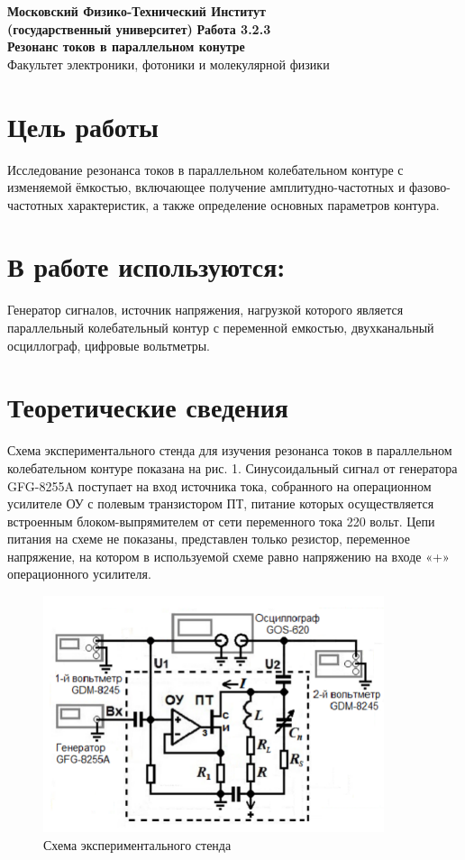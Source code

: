 \documentclass[11pt]{article}
\begin{document}
\begin{titlepage}
\begin{center}
\large\textbf{Московский Физико-Технический Институт}\\
\large\textbf{(государственный университет)}
\vfill
\huge\textbf{ Работа 3.2.3}\\
\huge\textbf{Резонанс токов в параллельном конутре}\\
\vfill
\large Факультет электроники, фотоники и молекулярной физики\\
\end{center}
\end{titlepage}
\tableofcontents
\newpage
\section{Цель работы}
Исследование резонанса токов в параллельном колебательном контуре с изменяемой ёмкостью, включающее получение амплитудно-частотных и фазово-частотных характеристик, а также определение основных параметров контура.
\section{В работе используются:}
Генератор сигналов, источник напряжения, нагрузкой которого является параллельный колебательный контур с переменной емкостью, двухканальный осциллограф, цифровые вольтметры.\\

\section{Теоретические сведения}

Схема экспериментального стенда для изучения резонанса токов в параллельном колебательном контуре показана на рис. 1. Синусоидальный сигнал от генератора GFG-8255A поступает на вход источника тока, собранного на операционном усилителе ОУ с полевым транзистором ПТ, питание которых осуществляется встроенным блоком-выпрямителем от сети переменного тока 220 вольт. Цепи питания на схеме не показаны, представлен только резистор, переменное напряжение, на котором в используемой схеме равно напряжению на входе «+» операционного усилителя. \\

\begin{figure}[h]
    \centering
    \includegraphics[width=10cm]{fig1.PNG}
    \caption{Схема экспериментального стенда}
    \label{fig:vac}
\end{figure}
\end{document}
